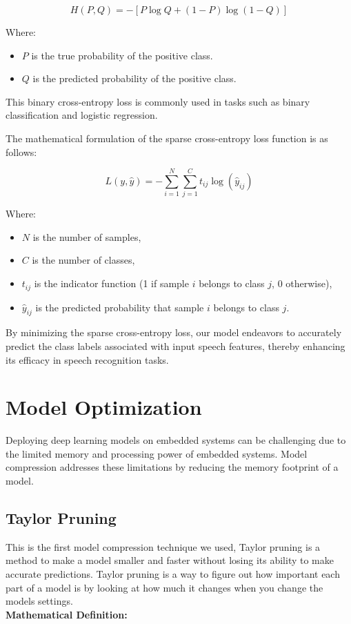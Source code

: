 \documentclass[a4paper]{report}
\begin{document}
{\[
H(P, Q) = -[P \log Q + (1 - P) \log (1 - Q)]
\]

Where:
\begin{itemize}
    \item $P$ is the true probability of the positive class.
    \item $Q$ is the predicted probability of the positive class.
\end{itemize}

This binary cross-entropy loss is commonly used in tasks such as binary classification and logistic regression.

The mathematical formulation of the sparse cross-entropy loss function is as follows:

\[
L(y, \hat{y}) = -\sum_{i=1}^{N} \sum_{j=1}^{C} t_{ij} \log(\hat{y}_{ij})
\]

Where:
\begin{itemize}
    \item $N$ is the number of samples,
    \item $C$ is the number of classes,
    \item $t_{ij}$ is the indicator function (1 if sample $i$ belongs to class $j$, 0 otherwise),
    \item $\hat{y}_{ij}$ is the predicted probability that sample $i$ belongs to class $j$.
\end{itemize}

By minimizing the sparse cross-entropy loss, our model endeavors to accurately predict the class labels associated with input speech features, thereby enhancing its efficacy in speech recognition tasks.
\section{Model Optimization}
Deploying deep learning models on embedded systems can be challenging due to the limited memory and processing power of embedded systems. Model compression addresses these limitations by reducing the memory footprint of a model.
\subsection{Taylor Pruning}
This is the first model compression technique we used, Taylor pruning is a method to make a model smaller and faster without losing its ability to make accurate predictions. Taylor pruning is a way to figure out how important each part of a model is by looking at how much it changes when you change the models settings.\\
\textbf{Mathematical Definition:}

}
\end{document}
